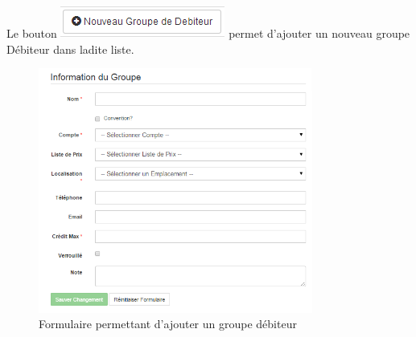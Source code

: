 \documentclass[12pt,a4paper]{report}
\begin{document}
Le bouton \includegraphics[scale=0.7]{pic/NewGroupDebit.png} permet d'ajouter un nouveau groupe Débiteur dans ladite liste.
\newpage
\begin{figure}[h]
\begin{center}
\includegraphics[width=9cm]{pic/FormAddGroupDebiteur.png}
\end{center}
\caption{Formulaire permettant d'ajouter un groupe débiteur}
\label{Formulaire permettant d'ajouter un groupe débiteur}
\end{figure}
\end{document}
